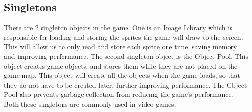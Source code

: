 \subsection*{Singletons}
There are 2 singleton objects in the game. One is an Image Library which is responsible for loading 
and storing the sprites the game will draw to the screen. This will allow us to only read and store 
each sprite one time, saving memory and improving performance. The second singleton object is the 
Object Pool. This object creates game objects, and stores them while they are not placed on the game 
map. This object will create all the objects when the game loads, so that they do not have to be 
created later, further improving performance. The Object Pool also prevents garbage collection from 
reducing the game's performance. Both these singletons are commonly used in video games.
